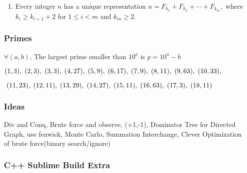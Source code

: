 \documentclass[12pt]{extarticle}
\begin{document}
\begin{multicols*}{2}
\begin{enumerate}
		\item Every integer $n$ has a unique representation
		$ n = F_{k_1} + F_{k_2} + \cdots + F_{k_m},$
		where $k_i \geq k_{i+1} + 2$ for $1 \leq i < m$ and $k_m \geq 2$.
	\end{enumerate}
	\subsubsection*{Primes}
	$\forall (a,b)$, The largest prime smaller than $10^a$ is $p = 10^{a} - b$
	\newline 
	\par
	$(1,3), \hspace{1mm}(2,3), \hspace{1mm}(3,3), \hspace{1mm}(4,27), \hspace{1mm}(5,9), \hspace{1mm}(6,17), \hspace{1mm}(7,9), \hspace{1mm}(8,11), \hspace{1mm}(9,63), \hspace{1mm}(10,33),$
		\newline 
	\par
	$ \hspace{1mm}(11,23), \hspace{1mm}(12,11), \hspace{1mm}(13,29), \hspace{1mm}(14,27), \hspace{1mm}(15,11), \hspace{1mm}(16,63), \hspace{1mm}(17,3), \hspace{1mm}(18,11)$
	\par\vskip 3pt
	\subsubsection*{Ideas}
	Div and Conq, Brute force and observe, (+1,-1), Dominator Tree for Directed Graph, use fenwick, Monte Carlo, Summation Interchange, Clever Optimization of brute force(binary search/ignore)
	
	\subsubsection*{C++ Sublime Build Extra}
	\raggedbottom
	\vfill

		\end{multicols*}
\end{document}
